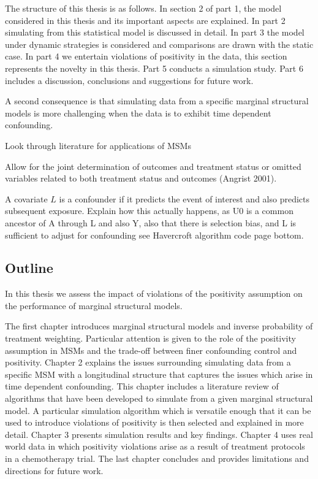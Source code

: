 \documentclass[11pt]{article}
\begin{document}
The structure of this thesis is as follows. In section 2 of part 1, the
model considered in this thesis and its important aspects are explained.
In part 2 simulating from this statistical model is discussed in detail.
In part 3 the model under dynamic strategies is considered and
comparisons are drawn with the static case. In part 4 we entertain
violations of positivity in the data, this section represents the
novelty in this thesis. Part 5 conducts a simulation study. Part 6
includes a discussion, conclusions and suggestions for future work.
\linebreak

A second consequence is that simulating data from a specific marginal
structural models is more challenging when the data is to exhibit time
dependent confounding.

Look through literature for applications of MSMs

    Allow for the joint determination of outcomes and treatment status or
omitted variables related to both treatment status and outcomes (Angrist
2001).

A covariate \(L\) is a confounder if it predicts the event of interest
and also predicts subsequent exposure. Explain how this actually
happens, as U0 is a common ancestor of A through L and also Y, also that
there is selection bias, and L is sufficient to adjust for confounding
see Havercroft algorithm code page bottom.

    \subsection{Outline}\label{outline}

In this thesis we assess the impact of violations of the positivity
assumption on the performance of marginal structural models. \linebreak

The first chapter introduces marginal structural models and inverse
probability of treatment weighting. Particular attention is given to the
role of the positivity assumption in MSMs and the trade-off between
finer confounding control and positivity. Chapter 2 explains the issues
surrounding simulating data from a specific MSM with a longitudinal
structure that captures the issues which arise in time dependent
confounding. This chapter includes a literature review of algorithms
that have been developed to simulate from a given marginal structural
model. A particular simulation algorithm which is versatile enough that
it can be used to introduce violations of positivity is then selected
and explained in more detail. Chapter 3 presents simulation results and
key findings. Chapter 4 uses real world data in which positivity
violations arise as a result of treatment protocols in a chemotherapy
trial. The last chapter concludes and provides limitations and
directions for future work.
\end{document}
